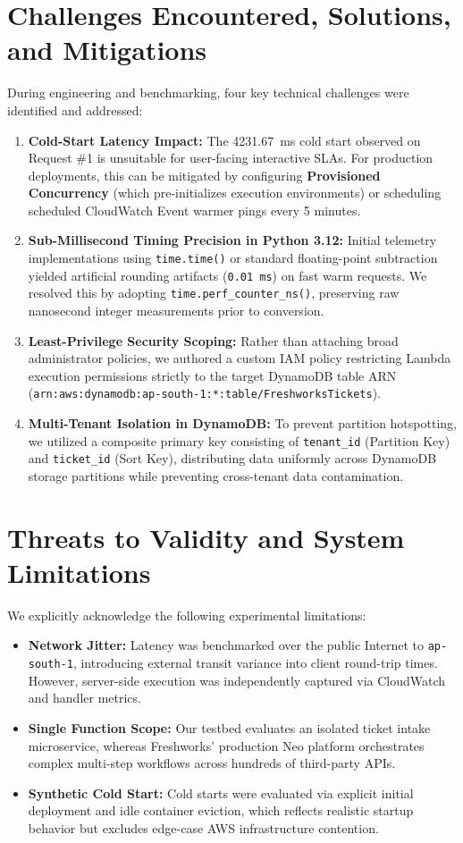 \documentclass[10pt,a4paper]{article}
\begin{document}
\section{Challenges Encountered, Solutions, and Mitigations}
During engineering and benchmarking, four key technical challenges were identified and addressed:
\begin{enumerate}
    \item \textbf{Cold-Start Latency Impact:} The 4231.67~ms cold start observed on Request \#1 is unsuitable for user-facing interactive SLAs. For production deployments, this can be mitigated by configuring \textbf{Provisioned Concurrency} (which pre-initializes execution environments) or scheduling scheduled CloudWatch Event warmer pings every 5 minutes.
    \item \textbf{Sub-Millisecond Timing Precision in Python 3.12:} Initial telemetry implementations using \texttt{time.time()} or standard floating-point subtraction yielded artificial rounding artifacts (\texttt{0.01~ms}) on fast warm requests. We resolved this by adopting \texttt{time.perf\_counter\_ns()}, preserving raw nanosecond integer measurements prior to conversion.
    \item \textbf{Least-Privilege Security Scoping:} Rather than attaching broad administrator policies, we authored a custom IAM policy restricting Lambda execution permissions strictly to the target DynamoDB table ARN (\texttt{arn:aws:dynamodb:ap-south-1:*:table/FreshworksTickets}).
    \item \textbf{Multi-Tenant Isolation in DynamoDB:} To prevent partition hotspotting, we utilized a composite primary key consisting of \texttt{tenant\_id} (Partition Key) and \texttt{ticket\_id} (Sort Key), distributing data uniformly across DynamoDB storage partitions while preventing cross-tenant data contamination.
\end{enumerate}

\section{Threats to Validity and System Limitations}
We explicitly acknowledge the following experimental limitations:
\begin{itemize}
    \item \textbf{Network Jitter:} Latency was benchmarked over the public Internet to \texttt{ap-south-1}, introducing external transit variance into client round-trip times. However, server-side execution was independently captured via CloudWatch and handler metrics.
    \item \textbf{Single Function Scope:} Our testbed evaluates an isolated ticket intake microservice, whereas Freshworks' production Neo platform orchestrates complex multi-step workflows across hundreds of third-party APIs.
    \item \textbf{Synthetic Cold Start:} Cold starts were evaluated via explicit initial deployment and idle container eviction, which reflects realistic startup behavior but excludes edge-case AWS infrastructure contention.
\end{itemize}
\end{document}
